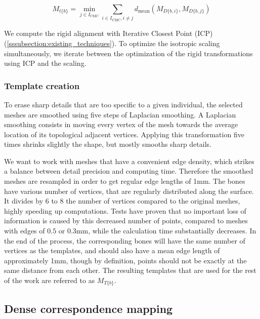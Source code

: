 \begin{equation}
	M_{t \{b\}} = \min_{j \in I_\text{CMC}} \sum_{i \in I_\text{CMC}, i \neq j} d_\text{mean}(M_{D\{b,i\}}, M_{D\{b,j\}})
	\label{eq:choice_template}
\end{equation}


We compute the rigid alignment with Iterative Closest Point (ICP) (\ref{sssubsection:existing_techniques}). To optimize the isotropic scaling simultaneously, we iterate between the optimization of the rigid transformations using ICP and the scaling. 

\subsubsection{Template creation}

To erase sharp details that are too specific to a given individual, the selected meshes are smoothed using five steps of Laplacian smoothing. A Laplacian smoothing consists in moving every vertex of the mesh towards the average location of its topological adjacent vertices. Applying this transformation five times shrinks slightly the shape, but mostly smooths sharp details.

We want to work with meshes that have a convenient edge density, which strikes a balance between detail precision and computing time. Therefore the smoothed meshes are resampled in order to get regular edge lengths of 1mm. The bones have various number of vertices, that are regularly distributed along the surface. It divides by 6 to 8 the number of vertices compared to the original meshes, highly speeding up computations. Tests have proven that no important loss of information is caused by this decreased number of points, compared to meshes with edges of $0.5$ or $0.3$mm, while the calculation time substantially decreases. In the end of the process, the corresponding bones will have the same number of vertices as the templates, and should also have a mean edge length of approximately 1mm, though by definition, points should not be exactly at the same distance from each other. The resulting templates that are used for the rest of the work are referred to as $M_{T \{b\}}$.



\subsection{Dense correspondence mapping}
\label{subsec:3_Method_warping}


